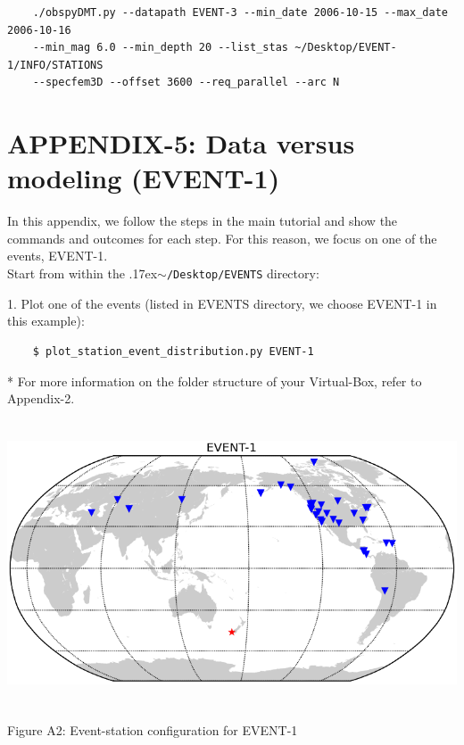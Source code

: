 \documentclass{article}
\newcommand{\ttilde}[0]{\raise.17ex\hbox{$\scriptstyle\sim$}}
\begin{document}
\begin{verbatim}
    ./obspyDMT.py --datapath EVENT-3 --min_date 2006-10-15 --max_date 2006-10-16 
    --min_mag 6.0 --min_depth 20 --list_stas ~/Desktop/EVENT-1/INFO/STATIONS 
    --specfem3D --offset 3600 --req_parallel --arc N
\end{verbatim}


\newpage

\section{APPENDIX-5: Data versus modeling (EVENT-1)}

In this appendix, we follow the steps in the main tutorial and show the commands 
and outcomes for each step. For this reason, we focus on one of the events, EVENT-1. \\

Start from within the \ttilde\verb|/Desktop/EVENTS| directory:

1. Plot one of the events (listed in EVENTS directory, we choose EVENT-1 in this example):
\begin{verbatim}
    $ plot_station_event_distribution.py EVENT-1
\end{verbatim}
* For more information on the folder structure of your Virtual-Box, refer to Appendix-2.

\begin{center}
\includegraphics[width=444pt, height=240pt, keepaspectratio=true]{AXISEMTutorial-fig006.png}

{\small{}Figure A2: Event-station configuration for EVENT-1}
\end{center}
\end{document}
